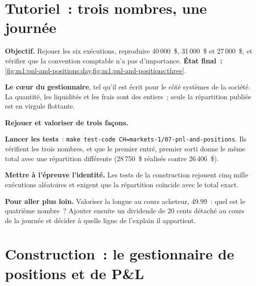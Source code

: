 \section{Tutoriel~: trois nombres, une journée}\label{tut:m1:pnl-and-positions:three}

\begin{tutorial}
\textbf{Objectif.} Rejouer les six exécutions, reproduire 40\,000~\$, 31\,000~\$ et
27\,000~\$, et vérifier que la convention comptable n'a pas d'importance.
\textbf{État final~:} \cref{fig:m1:pnl-and-positions:day,fig:m1:pnl-and-positions:three}.
\begin{tutsteps}
\item \textbf{Le cœur du gestionnaire}, tel qu'il est écrit pour le côté systèmes de
la société. La quantité, les liquidités et les frais sont des entiers~; seule la
répartition publiée est en virgule flottante.
\label{lst:m1:pnl-and-positions:cpp}
\item \textbf{Rejouer et valoriser de trois façons.}
\label{lst:m1:pnl-and-positions:three}
\item \textbf{Lancer les tests}~: \texttt{make test-code CH=markets-1/07-pnl-and-positions}.
Ils vérifient les trois nombres, et que le premier entré, premier sorti donne le même
total avec une répartition différente (28\,750~\$ réalisés contre 26\,406~\$).
\item \textbf{Mettre à l'épreuve l'identité.} Les tests de la construction rejouent cinq mille
exécutions aléatoires et exigent que la répartition coïncide avec le total exact.
\end{tutsteps}
\textbf{Pour aller plus loin.} Valoriser la  longue au cours acheteur, 49.99~: quel est le
quatrième nombre~? Ajouter ensuite un dividende de 20 cents détaché au cours de la journée et
décider à quelle ligne de l'explain il appartient.
\end{tutorial}

\section{Construction~: le gestionnaire de positions et de P\&L}\label{bld:m1:pnl-and-positions:keeper}


